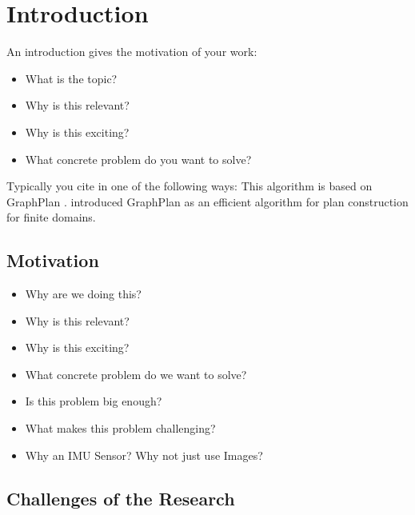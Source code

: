 \chapter{Introduction} \label{chapter_one}

An introduction gives the motivation of your work:
\begin{itemize}
\item What is the topic?
\item Why is this relevant?
\item Why is this exciting?
\item What concrete problem do you want to solve?
\end{itemize} 

Typically you cite in one of the following ways: This algorithm is based on {\sc GraphPlan} \citep{Blum97}. \citet{Blum97} introduced {\sc GraphPlan} as an efficient algorithm for plan construction for finite domains.

\section{Motivation}
\begin{itemize}
\item Why are we doing this?
\item Why is this relevant?
\item Why is this exciting?
\item What concrete problem do we want to solve?
\item Is this problem big enough?
\item What makes this problem challenging?
\item Why an IMU Sensor? Why not just use Images?
\end{itemize}

\section{Challenges of the Research}

